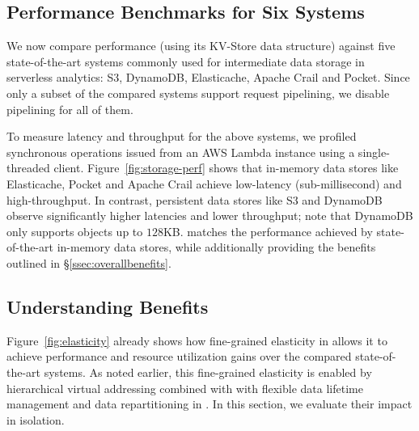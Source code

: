\subsection{Performance Benchmarks for Six Systems}
\label{ssec:hrelated}

We now compare \jiffy performance (using its KV-Store data structure) against five state-of-the-art systems commonly used for intermediate data storage in serverless analytics: S3, DynamoDB, Elasticache, Apache Crail and Pocket. Since only a subset of the compared systems support request pipelining, we disable pipelining for all of them. 



To measure latency and throughput for the above systems, we profiled synchronous operations issued from an AWS Lambda instance using a single-threaded client. Figure~\ref{fig:storage-perf} shows that in-memory data stores like Elasticache, Pocket and Apache Crail achieve low-latency (sub-millisecond) and high-throughput. In contrast, persistent data stores like S3 and DynamoDB observe significantly higher latencies and lower throughput; note that DynamoDB only supports objects up to $128$KB. \jiffy matches the performance achieved by state-of-the-art in-memory data stores, while additionally providing the benefits outlined in \S\ref{ssec:overallbenefits}.


\subsection{Understanding \jiffy Benefits}
\label{ssec:jiffybenefits}

Figure~\ref{fig:elasticity} already shows how fine-grained elasticity in \jiffy allows it to achieve performance and resource utilization gains over the compared state-of-the-art systems. As noted earlier, this fine-grained elasticity is enabled by hierarchical virtual addressing combined with with flexible data lifetime management and data repartitioning in \jiffy. In this section, we evaluate their impact in isolation.

